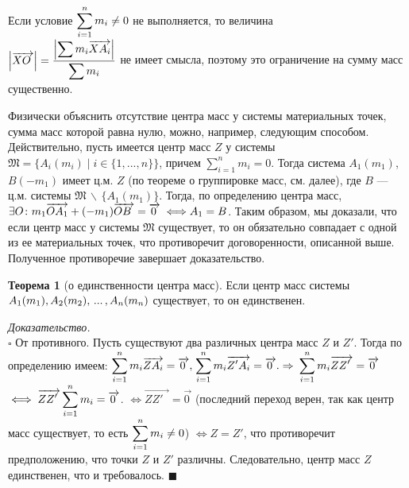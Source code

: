 \documentclass[14pt]{extarticle}
\let\vecarrow\overrightarrow
\theoremstyle{definition}
\theoremstyle{theorem}
\newtheorem*{theorem}{Теорема}
\renewenvironment{proof}
    {\noindent \textit{Доказательство.}\\
	\indent $\square$}
	{ $\blacksquare$\\ }
\newenvironment{note}
    {\noindent {\normalfont\fontsize{14}{14}\textbf{\textit{Примечание.}}}}
\DeclarePairedDelimiter\abs{\lvert}{\rvert}
\begin{document}
\begin{note}
	{
    Если условие $\mathlarger{\sum_{i=1}^{n} m_i \ne 0}$ не выполняется,
	то величина \\
	$\mathlarger{\abs*{\vecarrow{XO_{\;}}} = \frac{\displaystyle
    \abs*{\sum m_i \vecarrow{XA_i}}}{\displaystyle \sum m_i}}$
    не имеет смысла, поэтому это ограничение на сумму  масс %
    существенно. 
    \par} \vspace{2mm}
    \noindent
    Физически объяснить отсутствие центра масс у системы материальных точек,
    сумма масс которой равна нулю, можно, например, следующим способом. \\
    Действительно, пусть имеется
    центр масс \(Z\) у системы \(\mathfrak{M} = \big\{A_i(m_i) \mid i \in 
    \{1, ..., n\}\big\}\), причем  \(\displaystyle \sum_{i = 1}^{n}
    m_i = 0\). Тогда система %
    \(A_1(m_1)\), \(B(-m_1)\) имеет ц.м. \(Z\) 
    (по теореме о группировке масс, см. далее), где \(B\) --- ц.м. системы
    \(\mathfrak{M} \, \backslash \, \{ A_1(m_1) \} \). 
    Тогда, по определению центра масс,
    \(\exists O \colon m_1 \vecarrow{OA_1} + (-m_1) \vecarrow{OB_{\, \,}} = 
    \vecarrow{0_{\,}} \iff\\ A_1 = B\). Таким образом, мы доказали, что если центр
    масс у системы \(\mathfrak{M}\) существует, то он обязательно совпадает с одной
    из ее материальных точек, что противоречит договоренности, описанной выше.
    Полученное противоречие завершает доказательство. 
    

\end{note}

\begin{theorem}[о единственности центра масс]
    Если центр масс системы $A_1(m_1), \\  A_2(m_2), \, ... \, ,A_n(m_n)$
	существует, то он единственен.
\end{theorem}

\begin{proof}
От противного. Пусть существуют два различных центра масс $Z$ и $Z'$.
Тогда по определению имеем: $\mathlarger{\sum_{i=1}^{n} m_i  \vecarrow{ZA_i}
= \vecarrow{0_{\,}},} \;  \mathlarger{\sum_{i=1}^{n} m_i  \vecarrow{Z'A_i}} = \vecarrow{0_{\,}}. 
\Rightarrow$ $\mathlarger{\sum_{i=1}^{n} m_i  \vecarrow{ZZ'_{\;\:\,}}} = \vecarrow{0_{\,}}$
$\iff \mathlarger{\vecarrow{ZZ'_{\;\:\,}} \sum_{i=1}^{n} m_i} = \vecarrow{0_{\,}}$. 
$\iff \vecarrow{ZZ'_{\;\:\,}} = \vecarrow{0_{\,}}$ (последний переход верен, 
так как центр масс существует, то есть
$\mathlarger{\sum_{i=1}^{n} m_i \ne 0}$) $\iff Z = Z'$, что противоречит
предположению, что точки $Z$ и $Z'$ различны. Следовательно,
центр масс $Z$ единственен, что и требовалось.
\end{proof}
\end{document}
